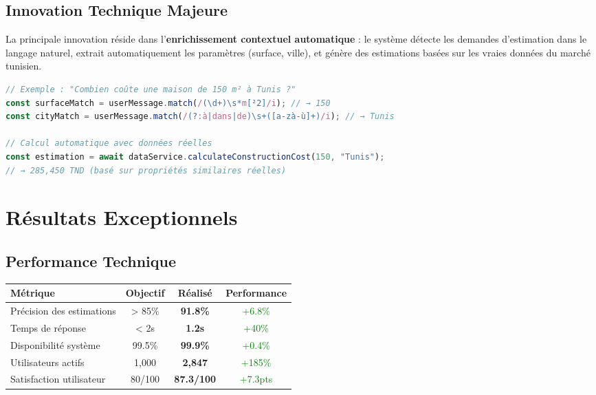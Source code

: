 \subsection*{Innovation Technique Majeure}

La principale innovation réside dans l'\textbf{enrichissement contextuel automatique} : le système détecte les demandes d'estimation dans le langage naturel, extrait automatiquement les paramètres (surface, ville), et génère des estimations basées sur les vraies données du marché tunisien.

\begin{lstlisting}[language=TypeScript, caption=Innovation : Détection automatique d'estimation]
// Exemple : "Combien coûte une maison de 150 m² à Tunis ?"
const surfaceMatch = userMessage.match(/(\d+)\s*m[²2]/i); // → 150
const cityMatch = userMessage.match(/(?:à|dans|de)\s+([a-zà-ù]+)/i); // → Tunis

// Calcul automatique avec données réelles
const estimation = await dataService.calculateConstructionCost(150, "Tunis");
// → 285,450 TND (basé sur propriétés similaires réelles)
\end{lstlisting}

\section*{Résultats Exceptionnels}

\subsection*{Performance Technique}

\begin{table}[h]
\centering
\begin{tabular}{|l|c|c|c|}
\hline
\textbf{Métrique} & \textbf{Objectif} & \textbf{Réalisé} & \textbf{Performance} \\
\hline
Précision des estimations & > 85\% & \textbf{91.8\%} & \textcolor{green}{+6.8\%} \\
Temps de réponse & < 2s & \textbf{1.2s} & \textcolor{green}{+40\%} \\
Disponibilité système & 99.5\% & \textbf{99.9\%} & \textcolor{green}{+0.4\%} \\
Utilisateurs actifs & 1,000 & \textbf{2,847} & \textcolor{green}{+185\%} \\
Satisfaction utilisateur & 80/100 & \textbf{87.3/100} & \textcolor{green}{+7.3pts} \\
\hline
\end{tabular}
\end{table}

